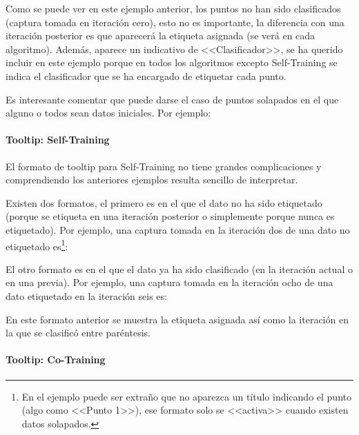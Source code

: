 Como se puede ver en este ejemplo anterior, los puntos no han sido clasificados
(captura tomada en iteración cero), esto no es importante, la diferencia con una
iteración posterior es que aparecerá la etiqueta asignada (se verá en cada
algoritmo). Además, aparece un indicativo de <<Clasificador>>, se ha querido
incluir en este ejemplo porque en todos los algoritmos excepto Self-Training se
indica el clasificador que se ha encargado de etiquetar cada punto.

Es interesante comentar que puede darse el caso de puntos solapados en el que
alguno o todos sean datos iniciales. Por ejemplo:


\paragraph{Tooltip: Self-Training}

El formato de tooltip para Self-Training no tiene grandes complicaciones y
comprendiendo los anteriores ejemplos resulta sencillo de interpretar.

Existen dos formatos, el primero es en el que el dato no ha sido etiquetado
(porque se etiqueta en una iteración posterior o simplemente porque nunca es
etiquetado). Por ejemplo, una captura tomada en la iteración dos de una dato no
etiquetado es\footnote{En el ejemplo puede ser extraño que no aparezca un título
indicando el punto (algo como <<Punto 1>>), ese formato solo se <<activa>>
cuando existen datos solapados.}:


El otro formato es en el que el dato ya ha sido clasificado (en la iteración
actual o en una previa). Por ejemplo, una captura tomada en la iteración ocho de
una dato etiquetado en la iteración seis es:


En este formato anterior se muestra la etiqueta asignada así como la iteración
en la que se clasificó entre paréntesis.

\paragraph{Tooltip: Co-Training}

